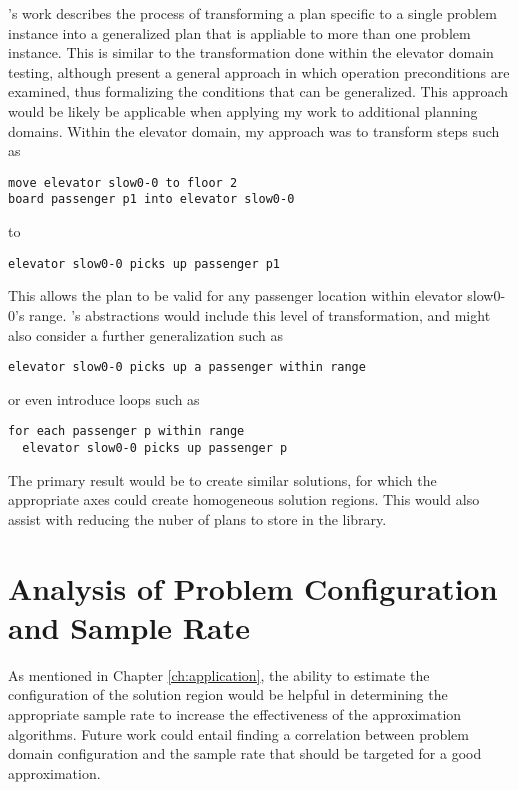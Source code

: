 
\cite{srivastava08generalized}'s work describes the process of transforming a plan specific to a single problem instance into a generalized plan that is appliable to more than one problem instance.  This is similar to the transformation done within the elevator domain testing, although \citeauthor{srivastava08generalized} present a general approach in which operation preconditions are examined, thus formalizing the conditions that can be generalized.  This approach would be likely be applicable when applying my work to additional planning domains.  Within the elevator domain, my approach was to transform steps such as 

\begin{verbatim}
move elevator slow0-0 to floor 2
board passenger p1 into elevator slow0-0
\end{verbatim}

\noindent
to 

\begin{verbatim}
elevator slow0-0 picks up passenger p1
\end{verbatim}

\noindent
This allows the plan to be valid for any passenger location within elevator slow0-0's range.  \citeauthor{srivastava08generalized}'s abstractions would include this level of transformation, and might also consider a further generalization such as 

\begin{verbatim}
elevator slow0-0 picks up a passenger within range
\end{verbatim}

\noindent
or even introduce loops such as

\begin{verbatim}
for each passenger p within range
  elevator slow0-0 picks up passenger p
\end{verbatim}

The primary result would be to create similar solutions, for which the appropriate axes could create homogeneous solution regions.  This would also assist with reducing the nuber of plans to store in the library.

\section{Analysis of Problem Configuration and Sample Rate}
As mentioned in Chapter \ref{ch:application}, the ability to estimate the configuration of the solution region would be helpful in determining the appropriate sample rate to increase the effectiveness of the approximation algorithms.  Future work could entail finding a correlation between problem domain configuration and the sample rate that should be targeted for a good approximation.


